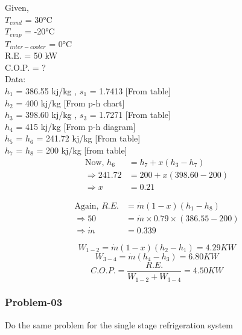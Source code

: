 \documentclass{article}
\begin{document}
\begin{multicols}{2}
  Given,\\
  $T_{cond}$ = 30°C \\
  $T_{evap}$ = -20°C \\
  $T_{inter-cooler}$ = 0°C \\
  R.E. = 50 kW \\
  C.O.P. = ? \\
  Data:\\
  $h_1$ = 386.55 kj/kg , $s_1$ = 1.7413 [From table] \\
  $h_2$ = 400 kj/kg [From p-h chart] \\
  $h_3$ = 398.60 kj/kg , $s_3$ = 1.7271 [From table] \\
  $h_4$ = 415 kj/kg [From p-h diagram] \\
  $h_5$ = $h_6$ = 241.72 kj/kg [From table] \\
  $h_7$ = $h_8$ = 200 kj/kg [from table] \\

  \begin{align*}
    \text{Now, } h_6 &= h_7 + x(h_3 - h_7) \\ 
    \Rightarrow 241.72 &= 200 + x (398.60 - 200) \\
    \Rightarrow x &= 0.21  
  \end{align*}

  
  \begin{align*}
    \text{Again, } R.E. &= \dot{m} (1-x)(h_1 - h_8) \\ 
    \Rightarrow 50 &= \dot{m} \times 0.79 \times (386.55 - 200) \\
    \Rightarrow \dot{m} &= 0.339  
  \end{align*}

$$W_{1-2} = \dot{m}(1-x) (h_2-h_1) = 4.29 KW$$
$$W_{3-4} = \dot{m} (h_4-h_3) = 6.80 KW$$
$$C.O.P. = \frac{R.E.}{W_{1-2} + W_{3-4}} = 4.50 KW$$
\end{multicols}

\subsubsection*{Problem-03}
Do the same problem for the single stage refrigeration system
\end{document}
